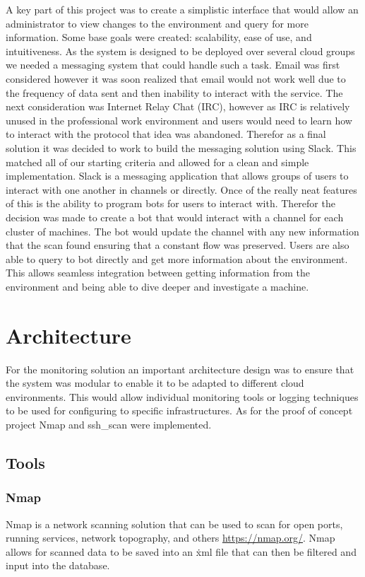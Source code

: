 \documentclass[12pt]{article}
\begin{document}
A key part of this project was to create a simplistic interface that would allow an administrator to view changes to the environment and query for more information. Some base goals were created: scalability, ease of use, and intuitiveness. As the system is designed to be deployed over several cloud groups we needed a messaging system that could handle such a task. Email was first considered however it was soon realized that email would not work well due to the frequency of data sent and then inability to interact with the service. The next consideration was Internet Relay Chat (IRC), however as IRC is relatively unused in the professional work environment and users would need to learn how to interact with the protocol that idea was abandoned. Therefor as a final solution it was decided to work to build the messaging solution using Slack. This matched all of our starting criteria and allowed for a clean and simple implementation. Slack is a messaging application that allows groups of users to interact with one another in channels or directly. Once of the really neat features of this is the ability to program bots for users to interact with. Therefor the decision was made to create a bot that would interact with a channel for each cluster of machines. The bot would update the channel with any new information that the scan found ensuring that a constant flow was preserved. Users are also able to query to bot directly and get more information about the environment. This allows seamless integration between getting information from the environment and being able to dive deeper and investigate a machine.

\section{Architecture}
For the monitoring solution an important architecture design was to ensure that the system was modular to enable it to be adapted to different cloud environments. This would allow individual monitoring tools or logging techniques to be used for configuring to specific infrastructures. As for the proof of concept project Nmap and ssh\_scan were implemented.

\subsection{Tools}

\subsubsection{Nmap}
Nmap is a network scanning solution that can be used to scan for open ports, running services, network topography, and others \href{https://nmap.org/}{https://nmap.org/}. Nmap allows for scanned data to be saved into an \.xml file that can then be filtered and input into the database.
\end{document}
